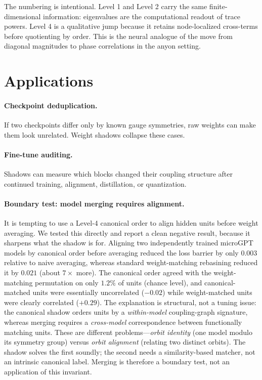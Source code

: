 \documentclass[11pt]{article}
\begin{document}
The numbering is intentional. Level 1 and Level 2 carry the same finite-dimensional information: eigenvalues are the computational readout of trace powers. Level 4 is a qualitative jump because it retains node-localized cross-terms before quotienting by order. This is the neural analogue of the move from diagonal magnitudes to phase correlations in the anyon setting.

\section{Applications}

\paragraph{Checkpoint deduplication.} If two checkpoints differ only by known gauge symmetries, raw weights can make them look unrelated. Weight shadows collapse these cases.

\paragraph{Fine-tune auditing.} Shadows can measure which blocks changed their coupling structure after continued training, alignment, distillation, or quantization.

\paragraph{Boundary test: model merging requires alignment.} It is tempting to use a Level-4 canonical order to align hidden units before weight averaging. We tested this directly and report a clean negative result, because it sharpens what the shadow is for. Aligning two independently trained microGPT models by canonical order before averaging reduced the loss barrier by only $0.003$ relative to naive averaging, whereas standard weight-matching rebasining reduced it by $0.021$ (about $7\times$ more). The canonical order agreed with the weight-matching permutation on only $1.2\%$ of units (chance level), and canonical-matched units were essentially uncorrelated ($-0.02$) while weight-matched units were clearly correlated ($+0.29$). The explanation is structural, not a tuning issue: the canonical shadow orders units by a \emph{within-model} coupling-graph signature, whereas merging requires a \emph{cross-model} correspondence between functionally matching units. These are different problems---\emph{orbit identity} (one model modulo its symmetry group) versus \emph{orbit alignment} (relating two distinct orbits). The shadow solves the first soundly; the second needs a similarity-based matcher, not an intrinsic canonical label. Merging is therefore a boundary test, not an application of this invariant.
\end{document}
